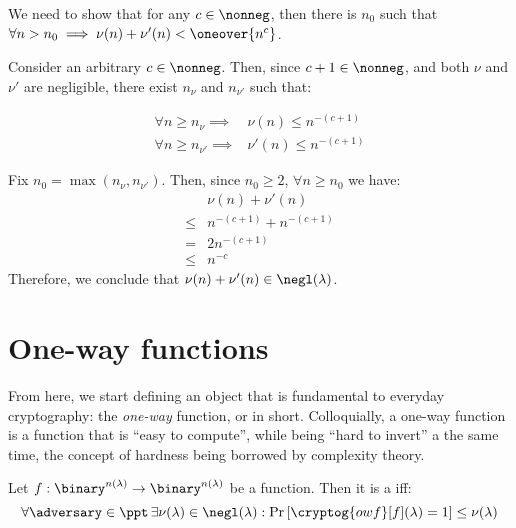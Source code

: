 \begin{solution}[\ref{ex:negl}]

    
    We need to show that for any $c \in \nonneg $, then there is $n_0$ such that $\forall n > n_{0} \implies \nu(n) + \nu'(n) < \oneover{n^c}$.
    
    Consider an arbitrary $c \in \nonneg$. Then, since $c + 1 \in \nonneg$, and both $\nu$ and $\nu'$ are negligible, there exist $n_\nu$ and $n_{\nu'}$ such that:
    
    \begin{align*}
        \forall n \geq n_{\nu} \implies& \nu(n) \leq n^{-(c+1)} \\
        \forall n \geq n_{\nu'} \implies& \nu'(n) \leq n^{-(c+1)}
    \end{align*}

    Fix $n_{0} = \max(n_{\nu}, n_{\nu'})$. Then, since $n_0 \geq 2$, $\forall n \geq n_0$ we have:
    \begin{align*}
        & \nu(n) + \nu'(n) \\
        \leq& n^{-(c+1)} + n^{-(c+1)} \\
        =& 2n^{-(c+1)} \\
        \leq& n^{-c}
    \end{align*}
    Therefore, we conclude that $\nu(n) + \nu'(n) \in \negl(\lambda)$.
\end{solution}


\section{One-way functions}

From here, we start defining an object that is fundamental to everyday cryptography: the \emph{one-way} function, or \owf{} in short. Colloquially, a one-way function is a function that is ``easy to compute'', while being ``hard to invert'' a the same time, the concept of hardness being borrowed by complexity theory.

\begin{definition}    
    Let $f : \binary^{n(\lambda)} \to \binary^{n(\lambda)}$ be a function. Then it is a \owf{} iff:
    \[
        \forall \adversary \in \ppt\, \exists \nu(\lambda) \in \negl(\lambda) : \Pr\left[\cryptog{owf}[f](\lambda) = 1 \right] \leq \nu(\lambda)
    \]
\end{definition}


